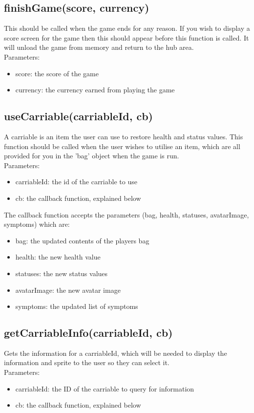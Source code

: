 \documentclass[a4paper,12pt]{article}
\begin{document}
\subsection*{finishGame(score, currency)}
This should be called when the game ends for any reason. If you wish to display a score screen for the game then
this should appear before this function is called. It will unload the game from memory and return to the hub area.\\
Parameters:
\begin{itemize}
	\setlength\itemsep{0em}
	\item score: the score of the game
	\item currency: the currency earned from playing the game
\end{itemize}

\newpage

\subsection*{useCarriable(carriableId, cb)}
A carriable is an item the user can use to restore health and status values. This function should be called when the
user wishes to utilise an item, which are all provided for you in the 'bag' object when the game is run.\\
Parameters:
\begin{itemize}
	\setlength\itemsep{0em}
	\item carriableId: the id of the carriable to use
	\item cb: the callback function, explained below
\end{itemize}

The callback function accepts the parameters (bag, health, statuses, avatarImage, symptoms) which are:
\begin{itemize}
	\setlength\itemsep{0em}
	\item bag: the updated contents of the players bag
	\item health: the new health value
	\item statuses: the new status values
	\item avatarImage: the new avatar image
	\item symptoms: the updated list of symptoms
\end{itemize}

\subsection*{getCarriableInfo(carriableId, cb)}
Gets the information for a carriableId, which will be needed to display the information and sprite to the user
so they can select it.\\
Parameters:
\begin{itemize}
	\setlength\itemsep{0em}
	\item carriableId: the ID of the carriable to query for information
	\item cb: the callback function, explained below
\end{itemize}
\end{document}
